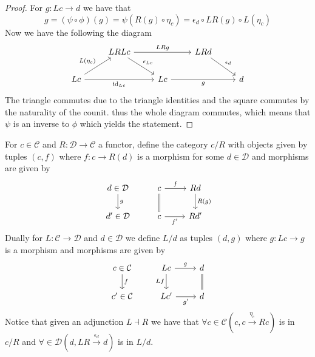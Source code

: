 \begin{proof}
    For $g \colon Lc \to d$ we have that 
    \[
        g=(\psi\circ\phi)(g) = \psi(R(g) \circ \eta_c) = \epsilon_d \circ LR(g) \circ L(\eta_c)
    \]
    Now we have the following the diagram
    \[
    \begin{tikzcd}
        &
        LRLc
        \arrow[rd, "\epsilon_{Lc}"]
        \arrow[rr, "LRg"]
        &
        &
        LRd
        \arrow[rd, "\epsilon_d"]
        \\
        Lc 
        \arrow[ru,"L(\eta_c)"]
        \arrow[rr,"\id_{Lc}"']
        &
        &
        Lc 
        \arrow[rr,"g"']
        &
        &
        d
    \end{tikzcd}
    \]
    The triangle commutes due to the triangle identities and the square commutes by the naturality of the counit. thus the whole diagram commutes, which means that $\psi$ is an inverse to $\phi$ which yields the statement.    
\end{proof}

\begin{defi}
    For $c \in \mathcal{C}$ and $R\colon \mathcal{D}\to\mathcal{C}$ a functor, define the category $c/R$ with objects given by tuples $(c,f)$
    where $f\colon c \to R(d)$ is a morphism for some $d\in \mathcal{D}$ and morphisms are given by 
    \[
    \begin{tikzcd}
        d \in \mathcal{D} 
        \arrow[d,"g"]
        &
        c
        \arrow[r,"f"]
        \arrow[d, equal]
        &
        Rd
        \arrow[d,"R(g)"]
        \\
        d' \in \mathcal{D}
        &
        c
        \arrow[r,"f'"']
        &
        Rd'
    \end{tikzcd}
    \]
    Dually for $L \colon \mathcal{C} \to \mathcal{D}$ and $d \in \mathcal{D}$ we define $L/d$ as tuples $(d,g)$ where $g\colon Lc \to g$ is a morphism and morphisms are given by 
    \[
    \begin{tikzcd}
        c \in \mathcal{C} 
        \arrow[d,"f"]
        &
        Lc
        \arrow[r,"g"]
        \arrow[d, "Lf"']
        &
        d
        \arrow[d, equal]
        \\
        c' \in \mathcal{C}
        &
        Lc'
        \arrow[r,"g'"']
        &
        d
    \end{tikzcd}
    \]
    Notice that given an adjunction $ L \dashv R$ we have that $\forall c \in \mathcal{C} (c,c \xrightarrow{\eta_c} Rc)$ is in $c/R$ and $\forall \in \mathcal{D}(d, LR \xrightarrow{\epsilon_d} d)$ is in $L/d$.
\end{defi}


